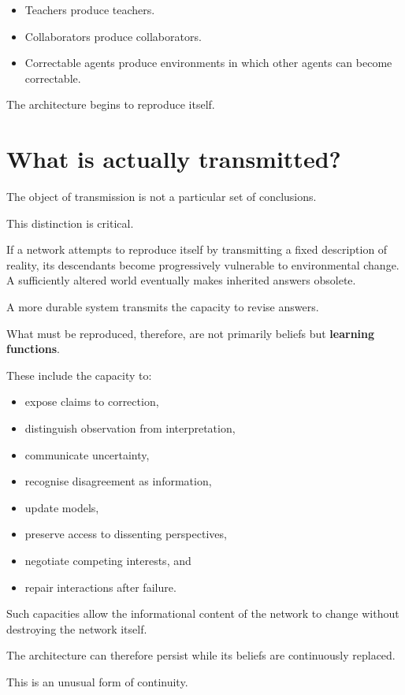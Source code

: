 \documentclass[11pt, a4paper]{article}
\begin{document}
\begin{itemize}[leftmargin=*]
    \item Teachers produce teachers.
    \item Collaborators produce collaborators.
    \item Correctable agents produce environments in which other agents can become correctable.
\end{itemize}

The architecture begins to reproduce itself.

\section{What is actually transmitted?}
The object of transmission is not a particular set of conclusions.

This distinction is critical.

If a network attempts to reproduce itself by transmitting a fixed description of reality, its descendants become progressively vulnerable to environmental change. A sufficiently altered world eventually makes inherited answers obsolete.

A more durable system transmits the capacity to revise answers.

What must be reproduced, therefore, are not primarily beliefs but \textbf{learning functions}.

These include the capacity to:
\begin{itemize}[leftmargin=*]
    \item expose claims to correction,
    \item distinguish observation from interpretation,
    \item communicate uncertainty,
    \item recognise disagreement as information,
    \item update models,
    \item preserve access to dissenting perspectives,
    \item negotiate competing interests, and
    \item repair interactions after failure.
\end{itemize}

Such capacities allow the informational content of the network to change without destroying the network itself.

The architecture can therefore persist while its beliefs are continuously replaced.

This is an unusual form of continuity.
\end{document}
